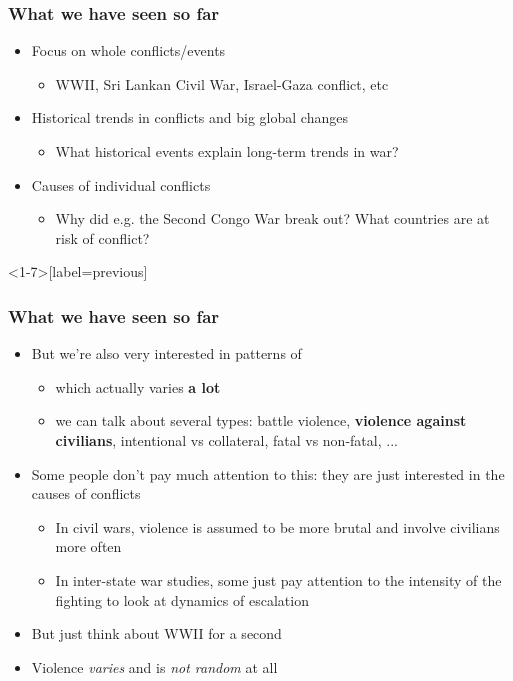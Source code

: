 \documentclass[aspectratio=43]{beamer}
\begin{document}
\begin{frame}
\frametitle{What we have seen so far}
\centering

\begin{itemize}
  \item<1-> Focus on whole conflicts/events
  \begin{itemize}
    \item WWII, Sri Lankan Civil War, Israel-Gaza conflict, etc
  \end{itemize}
  \item<2-> Historical trends in conflicts and big global changes
  \begin{itemize}
    \item What historical events explain long-term trends in war?
  \end{itemize}
  \item<3-> Causes of individual conflicts
  \begin{itemize}
    \item Why did e.g. the Second Congo War break out? What countries are at risk of conflict?
  \end{itemize}
\end{itemize}

\end{frame}

\begin{frame}<1-7>[label=previous]
\frametitle{What we have seen so far}
\centering

\begin{itemize}[<+->]
  \item But we're also very interested in patterns of 
  \begin{itemize}
    \item which actually varies \textbf{a lot}
    \item we can talk about several types: battle violence, \textbf{violence against civilians}, intentional vs collateral, fatal vs non-fatal, ...
  \end{itemize}
  \item Some people don't pay much attention to this: they are just interested in the causes of conflicts
  \begin{itemize}
    \item In civil wars, violence is assumed to be more brutal and involve civilians more often
    \item In inter-state war studies, some just pay attention to the intensity of the fighting to look at dynamics of escalation
  \end{itemize}
  \item But just think about WWII for a second
  \item Violence \textit{varies} and is \textit{not random} at all
\end{itemize}

\end{frame}
\end{document}
